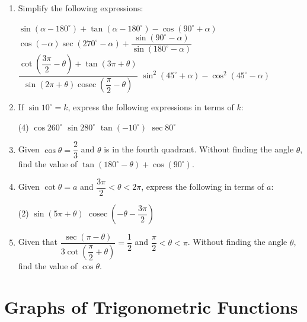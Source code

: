 \documentclass{report}
\begin{document}
    \newpage


    \begin{enumerate}
        \item Simplify the following expressions:
        \begin{tasks}[label=(\alph*)]
            \task $\sin \left(\alpha-180^{\circ}\right)+\tan \left(\alpha-180^{\circ}\right)-\cos \left(90^{\circ}+\alpha\right)$
            \task $\cos (-\alpha) \sec \left(270^{\circ}-\alpha\right)+\dfrac{\sin \left(90^{\circ}-\alpha\right)}{\sin \left(180^{\circ}-\alpha\right)}$
            \task $\dfrac{\cot \left(\dfrac{3 \pi}{2}-\theta\right)+\tan (3 \pi+\theta)}{\sin (2 \pi+\theta) \operatorname{cosec}\left(\dfrac{\pi}{2}-\theta\right)}$
            \task $\sin ^2\left(45^{\circ}+\alpha\right)-\cos ^2\left(45^{\circ}-\alpha\right)$
        \end{tasks}

        \item If $\sin 10^{\circ} = k$, express the following expressions in terms of $k$:
        \begin{tasks}[label=(\alph*)](4)
            \task $\cos 260^{\circ}$
            \task $\sin 280^{\circ}$
            \task $\tan \left(-10^{\circ}\right)$
            \task $\sec 80^{\circ}$
        \end{tasks}
        \item Given $\cos \theta=\dfrac{2}{3}$ and $\theta$ is in the fourth quadrant. Without finding the angle $\theta$, find the value of $\tan \left(180^{\circ}-\theta\right)+\cos \left(90^{\circ}\right)$.
        \item Given $\cot \theta=a$ and $\dfrac{3 \pi}{2}<\theta<2 \pi$, express the following in terms of $a$:
        \begin{tasks}[label=(\alph*)](2)
            \task $\sin (5 \pi+\theta)$
            \task $\operatorname{cosec}\left(-\theta-\dfrac{3 \pi}{2}\right)$
        \end{tasks}
        \item Given that $\dfrac{\sec (\pi-\theta)}{3 \cot \left(\dfrac{\pi}{2}+\theta\right)}=\dfrac{1}{2}$ and $\dfrac{\pi}{2}<\theta<\pi$. Without finding the angle $\theta$, find the value of $\cos \theta$.
    \end{enumerate}

    \section{Graphs of Trigonometric Functions}
\end{document}
